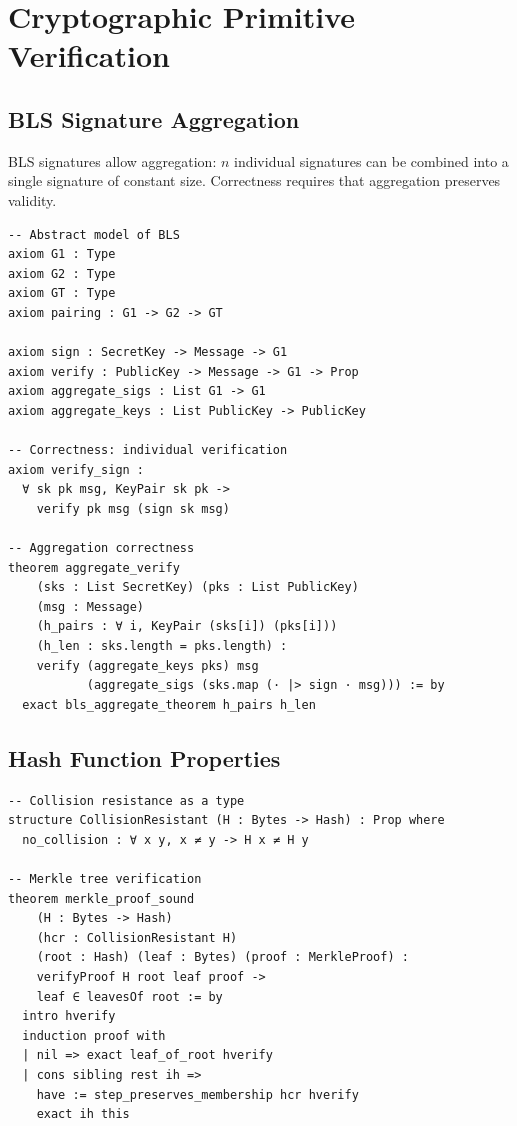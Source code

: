 \section{Cryptographic Primitive Verification}


\subsection{BLS Signature Aggregation}

BLS signatures allow aggregation: $n$ individual signatures can be combined into a single
signature of constant size. Correctness requires that aggregation preserves validity.

\begin{lstlisting}[language=Lean,caption={BLS aggregation correctness}]
-- Abstract model of BLS
axiom G1 : Type
axiom G2 : Type
axiom GT : Type
axiom pairing : G1 -> G2 -> GT

axiom sign : SecretKey -> Message -> G1
axiom verify : PublicKey -> Message -> G1 -> Prop
axiom aggregate_sigs : List G1 -> G1
axiom aggregate_keys : List PublicKey -> PublicKey

-- Correctness: individual verification
axiom verify_sign :
  ∀ sk pk msg, KeyPair sk pk ->
    verify pk msg (sign sk msg)

-- Aggregation correctness
theorem aggregate_verify
    (sks : List SecretKey) (pks : List PublicKey)
    (msg : Message)
    (h_pairs : ∀ i, KeyPair (sks[i]) (pks[i]))
    (h_len : sks.length = pks.length) :
    verify (aggregate_keys pks) msg
           (aggregate_sigs (sks.map (· |> sign · msg))) := by
  exact bls_aggregate_theorem h_pairs h_len
\end{lstlisting}

\subsection{Hash Function Properties}

\begin{lstlisting}[language=Lean,caption={Hash function model}]
-- Collision resistance as a type
structure CollisionResistant (H : Bytes -> Hash) : Prop where
  no_collision : ∀ x y, x ≠ y -> H x ≠ H y

-- Merkle tree verification
theorem merkle_proof_sound
    (H : Bytes -> Hash)
    (hcr : CollisionResistant H)
    (root : Hash) (leaf : Bytes) (proof : MerkleProof) :
    verifyProof H root leaf proof ->
    leaf ∈ leavesOf root := by
  intro hverify
  induction proof with
  | nil => exact leaf_of_root hverify
  | cons sibling rest ih =>
    have := step_preserves_membership hcr hverify
    exact ih this
\end{lstlisting}

